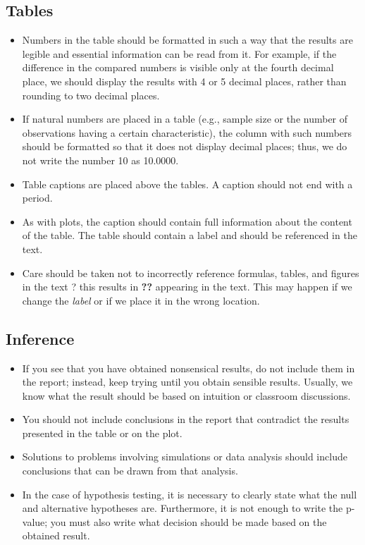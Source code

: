 \documentclass[12pt, a4paper]{article}\usepackage[]{graphicx}\usepackage[]{xcolor}
\begin{document}
\subsection{Tables}
\begin{itemize}
\item Numbers in the table should be formatted in such a way that the results are legible and essential information can be read from it. For example, if the difference in the compared numbers is visible only at the fourth decimal place, we should display the results with 4 or 5 decimal places, rather than rounding to two decimal places.
\item If natural numbers are placed in a table (e.g., sample size or the number of observations having a certain characteristic), the column with such numbers should be formatted so that it does not display decimal places; thus, we do not write the number 10 as 10.0000.
\item 
Table captions are placed above the tables. A caption should not end with a period.
\item 
As with plots, the caption should contain full information about the content of the table. The table should contain a label and should be referenced in the text. 
\item Care should be taken not to incorrectly reference formulas, tables, and figures in the text ? this results in \textbf{??} appearing in the text. This may happen if we change the \textit{label} or if we place it in the wrong location.
\end{itemize}

\subsection{Inference}
\begin{itemize}
    \item If you see that you have obtained nonsensical results, do not include them in the report; instead, keep trying until you obtain sensible results. Usually, we know what the result should be based on intuition or classroom discussions.
    \item You should not include conclusions in the report that contradict the results presented in the table or on the plot.
    \item Solutions to problems involving simulations or data analysis should include conclusions that can be drawn from that analysis. 
    \item In the case of hypothesis testing, it is necessary to clearly state what the null and alternative hypotheses are. Furthermore, it is not enough to write the p-value; you must also write what decision should be made based on the obtained result.
\end{itemize}
\end{document}
